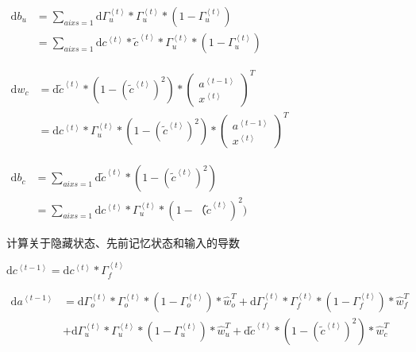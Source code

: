 \documentclass[
]{article}
\begin{document}
\(\begin{aligned}\mathrm{d}b_u &=\sum_{aixs=1}\mathrm{d}\Gamma_{u}^{\left\langle t\right\rangle}*\Gamma_{u}^{\left\langle t\right\rangle}*(1-\Gamma_{u}^{\left\langle t\right\rangle})\\&=\sum_{aixs=1}\mathrm{d}c^{\left\langle t\right\rangle}*\tilde{c}^{\left\langle t\right\rangle}*\Gamma_{u}^{\left\langle t\right\rangle}*(1-\Gamma_{u}^{\left\langle t\right\rangle})\end{aligned}\)

\(\begin{aligned}\mathrm{d}w_c &=\mathrm{d}\tilde{c}^{\left\langle t\right\rangle}*(1-(\tilde{c}^{\left\langle t\right\rangle})^2)* \left(\begin{array} {c}a^{\left \langle t-1\right\rangle} \\x^{\left \langle t\right\rangle}\end{array}\right)^T\\ &=\mathrm{d}c^{\left\langle t\right\rangle}*\Gamma_{u}^{\left\langle t\right\rangle}*(1-(\tilde{c}^{\left\langle t\right\rangle})^2)* \left(\begin{array} {c}a^{\left \langle t-1\right\rangle} \\x^{\left \langle t\right\rangle}\end{array}\right)^T\end{aligned}\)

\(\begin{aligned}\mathrm{d}b_c &=\sum_{aixs=1}\mathrm{d}\tilde{c}^{\left\langle t\right\rangle}*(1-(\tilde{c}^{\left\langle t\right\rangle})^2)\\&=\sum_{aixs=1}\mathrm{d}c^{\left\langle t\right\rangle}*\Gamma_{u}^{\left\langle t\right\rangle}*(1-（\tilde{c}^{\left\langle t\right\rangle})^2)\end{aligned}\)

计算关于隐藏状态、先前记忆状态和输入的导数

\(\mathrm{d}c^{\left\langle t-1\right\rangle}=\mathrm{d}c^{\left\langle t\right\rangle}*\Gamma_{f}^{\left\langle t\right\rangle}\)

\(\begin{aligned}\mathrm{d} a^{\left\langle t-1\right\rangle}&= \mathrm{d}\Gamma_{o}^{\left\langle t\right\rangle}*\Gamma_{o}^{\left\langle t\right\rangle}*(1-\Gamma_{o}^{\left\langle t\right\rangle})*\hat{w}_o^T + \mathrm{d}\Gamma_{f}^{\left\langle t\right\rangle}*\Gamma_{f}^{\left\langle t\right\rangle}*(1-\Gamma_{f}^{\left\langle t\right\rangle})*\hat{w}_f^T \\&+\mathrm{d}\Gamma_{u}^{\left\langle t\right\rangle}*\Gamma_{u}^{\left\langle t\right\rangle}*(1-\Gamma_{u}^{\left\langle t\right\rangle})*\hat{w}_u^T+\mathrm{d}\tilde{c}^{\left\langle t\right\rangle}*(1-(\tilde{c}^{\left\langle t\right\rangle})^2)*\hat{w}_c^T\end{aligned}\)
\end{document}
